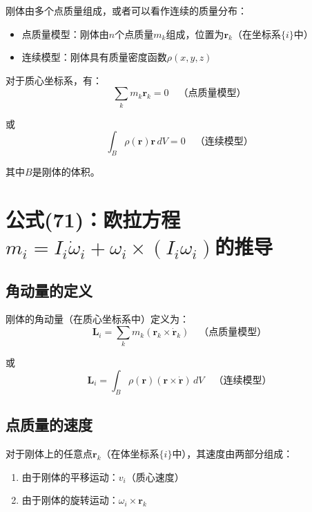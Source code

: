 \documentclass[12pt,a4paper]{article}
\begin{document}
刚体由多个点质量组成，或者可以看作连续的质量分布：
\begin{itemize}
\item 点质量模型：刚体由$n$个点质量$m_k$组成，位置为$\bm{r}_k$（在坐标系$\{i\}$中）
\item 连续模型：刚体具有质量密度函数$\rho(x, y, z)$
\end{itemize}

对于质心坐标系，有：
\begin{equation}
\sum_k m_k \bm{r}_k = 0 \quad \text{（点质量模型）}
\end{equation}

或
\begin{equation}
\int_B \rho(\bm{r}) \bm{r} \, dV = 0 \quad \text{（连续模型）}
\end{equation}

其中$B$是刚体的体积。

\section{公式(71)：欧拉方程$m_i = I_i \dot{\omega}_i + \omega_i \times (I_i \omega_i)$的推导}

\subsection{角动量的定义}

刚体的角动量（在质心坐标系中）定义为：
\begin{equation}
\bm{L}_i = \sum_k m_k (\bm{r}_k \times \dot{\bm{r}}_k) \quad \text{（点质量模型）}
\label{eq:angular_momentum_discrete}
\end{equation}

或
\begin{equation}
\bm{L}_i = \int_B \rho(\bm{r}) (\bm{r} \times \dot{\bm{r}}) \, dV \quad \text{（连续模型）}
\label{eq:angular_momentum_continuous}
\end{equation}

\subsection{点质量的速度}

对于刚体上的任意点$\bm{r}_k$（在体坐标系$\{i\}$中），其速度由两部分组成：
\begin{enumerate}
\item 由于刚体的平移运动：$v_i$（质心速度）
\item 由于刚体的旋转运动：$\omega_i \times \bm{r}_k$
\end{enumerate}
\end{document}

